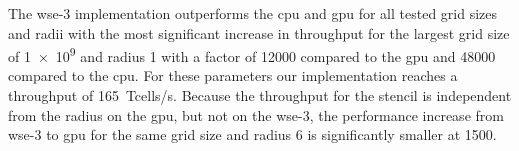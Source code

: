 The \ac{wse}-3 implementation outperforms the \ac{cpu} and \ac{gpu} for all tested grid sizes and radii with the most significant increase in throughput for the largest grid size of \num{1e9} and radius \num{1} with a factor of \num{12000} compared to the \ac{gpu} and \num{48000} compared to the \ac{cpu}. For these parameters our implementation reaches a throughput of \qty{165}{\tera cells/s}. Because the throughput for the stencil is independent from the radius on the \ac{gpu}, but not on the \ac{wse}-3, the performance increase from \ac{wse}-3 to \ac{gpu} for the same grid size and radius \num{6} is significantly smaller at \num{1500}.






